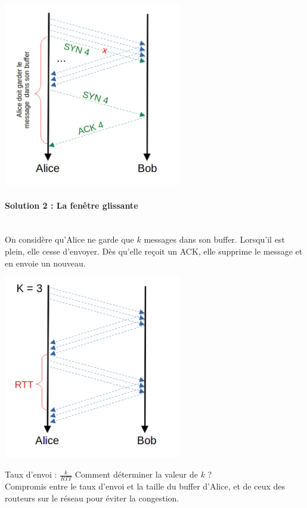 \begin{center}
	\includegraphics[height = 8cm]{Developpements/TCP/continu.png} \\
\end{center}

\paragraph{Solution 2 : La fenêtre glissante}
\enspace\\
On considère qu'Alice ne garde que $k$ messages dans son buffer. Lorsqu'il est plein, elle cesse d'envoyer. Dès qu'elle reçoit un ACK, elle supprime le message et en envoie un nouveau.

\begin{center}
	\includegraphics[height = 8cm]{Developpements/TCP/fenetre.png} \\
\end{center}

Taux d'envoi :  $\frac{k}{RTT}$
Comment déterminer la valeur de $k$ ? \\
Compromis entre le taux d'envoi et la taille du buffer d'Alice, et de ceux des routeurs sur le réseau pour éviter la congestion.

